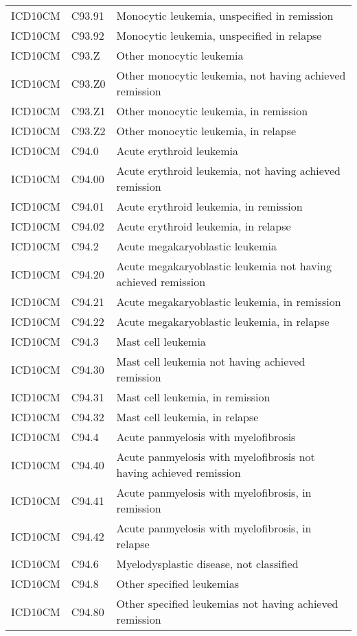 \begin{longtable}{p{}p{}p{}}
  ICD10CM & C93.91 & Monocytic leukemia, unspecified in remission \\ 
  ICD10CM & C93.92 & Monocytic leukemia, unspecified in relapse \\ 
  ICD10CM & C93.Z & Other monocytic leukemia \\ 
  ICD10CM & C93.Z0 & Other monocytic leukemia, not having achieved remission \\ 
  ICD10CM & C93.Z1 & Other monocytic leukemia, in remission \\ 
  ICD10CM & C93.Z2 & Other monocytic leukemia, in relapse \\ 
  ICD10CM & C94.0 & Acute erythroid leukemia \\ 
  ICD10CM & C94.00 & Acute erythroid leukemia, not having achieved remission \\ 
  ICD10CM & C94.01 & Acute erythroid leukemia, in remission \\ 
  ICD10CM & C94.02 & Acute erythroid leukemia, in relapse \\ 
  ICD10CM & C94.2 & Acute megakaryoblastic leukemia \\ 
  ICD10CM & C94.20 & Acute megakaryoblastic leukemia not having achieved remission \\ 
  ICD10CM & C94.21 & Acute megakaryoblastic leukemia, in remission \\ 
  ICD10CM & C94.22 & Acute megakaryoblastic leukemia, in relapse \\ 
  ICD10CM & C94.3 & Mast cell leukemia \\ 
  ICD10CM & C94.30 & Mast cell leukemia not having achieved remission \\ 
  ICD10CM & C94.31 & Mast cell leukemia, in remission \\ 
  ICD10CM & C94.32 & Mast cell leukemia, in relapse \\ 
  ICD10CM & C94.4 & Acute panmyelosis with myelofibrosis \\ 
  ICD10CM & C94.40 & Acute panmyelosis with myelofibrosis not having achieved remission \\ 
  ICD10CM & C94.41 & Acute panmyelosis with myelofibrosis, in remission \\ 
  ICD10CM & C94.42 & Acute panmyelosis with myelofibrosis, in relapse \\ 
  ICD10CM & C94.6 & Myelodysplastic disease, not classified \\ 
  ICD10CM & C94.8 & Other specified leukemias \\ 
  ICD10CM & C94.80 & Other specified leukemias not having achieved remission \\ 

\end{longtable}
